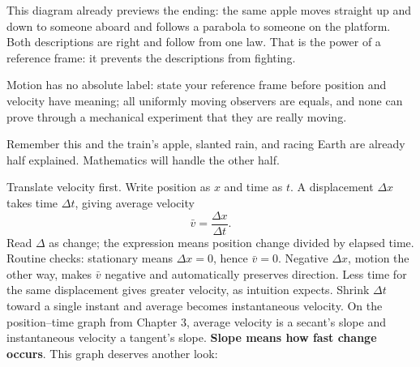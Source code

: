This diagram already previews the ending: the same apple moves straight up and down to someone aboard and follows a parabola to someone on the platform. Both descriptions are right and follow from one law. That is the power of a reference frame: it prevents the descriptions from fighting.


\begin{oneline}
Motion has no absolute label: state your reference frame before position and velocity have meaning; all uniformly moving observers are equals, and none can prove through a mechanical experiment that they are really moving.
\end{oneline}

Remember this and the train's apple, slanted rain, and racing Earth are already half explained. Mathematics will handle the other half.


\begin{mainline}
Translate velocity first. Write position as \(x\) and time as \(t\). A displacement \(\Delta x\) takes time \(\Delta t\), giving average velocity
\[
  \bar v=\frac{\Delta x}{\Delta t}.
\]
Read \(\Delta\) as change; the expression means position change divided by elapsed time. Routine checks: stationary means \(\Delta x=0\), hence \(\bar v=0\). Negative \(\Delta x\), motion the other way, makes \(\bar v\) negative and automatically preserves direction. Less time for the same displacement gives greater velocity, as intuition expects. Shrink \(\Delta t\) toward a single instant and average becomes instantaneous velocity. On the position--time graph from Chapter 3, average velocity is a secant's slope and instantaneous velocity a tangent's slope. \textbf{Slope means how fast change occurs}. This graph deserves another look:
\end{mainline}

\begin{center}
\end{center}


